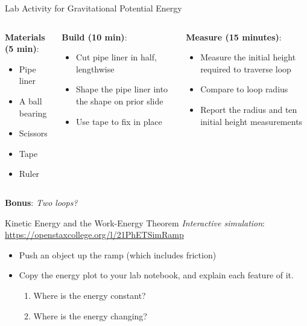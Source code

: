 \documentclass{beamer}
\begin{document}
\begin{frame}{Lab Activity for Gravitational Potential Energy }
\small
\begin{columns}[T]
\begin{column}{0.33\textwidth}
\textbf{Materials (5 min)}:
\begin{itemize}
\item Pipe liner
\item A ball bearing
\item Scissors
\item Tape
\item Ruler
\end{itemize}
\end{column}
\begin{column}{0.33\textwidth}
\textbf{Build (10 min)}:
\begin{itemize}
\item Cut pipe liner in half, lengthwise
\item Shape the pipe liner into the shape on prior slide
\item Use tape to fix in place
\end{itemize}
\end{column}
\begin{column}{0.33\textwidth}
\textbf{Measure (15 minutes)}:
\begin{itemize}
\item Measure the initial height required to traverse loop
\item Compare to loop radius
\item Report the radius and ten initial height measurements
\end{itemize}
\end{column}
\end{columns}
\alert{\textbf{Bonus}: \textit{Two loops?}}
\end{frame}

\begin{frame}{Kinetic Energy and the Work-Energy Theorem}
\textit{Interactive simulation}:
\url{https://openstaxcollege.org/l/21PhETSimRamp}
\begin{itemize}
\item Push an object up the ramp (which includes friction)
\item Copy the energy plot to your lab notebook, and explain each feature of it.
\begin{enumerate}
\item Where is the energy constant?
\item Where is the energy changing?
\end{enumerate}
\end{itemize}
\end{frame}
\end{document}
